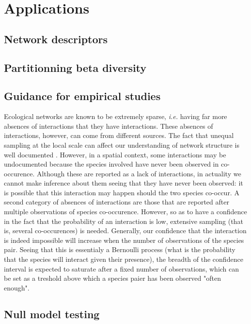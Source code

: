 \documentclass[12pt]{article}
\begin{document}
\newpage
\section*{Applications}

\subsection*{Network descriptors}

\subsection*{Partitionning beta diversity}

\subsection*{Guidance for empirical studies}

Ecological networks are known to be extremely sparse, \emph{i.e.} having far
more absences of interactions that they have interactions. These absences of
interactions, however, can come from different sources. The fact that unequal
sampling at the local scale can affect our understanding of network structure
is well documented \parencite{Martinez1999}. However, in a spatial context,
some interactions may be undocumented because the species involved have
never been observed in co-occurence. Although these are reported as a lack
of interactions, in actuality we cannot make inference about them seeing
that they have never been observed: it is possible that this interaction
may happen should the two species co-occur. A second category of absences
of interactions are those that are reported after multiple observations of
species co-occurence. However, so as to have a confidence in the fact that the
probability of an interaction is low, extensive sampling (that is, several
co-occurences) is needed. Generally, our confidence that the interaction
is indeed impossible will increase when the number of observations of the
species pair. Seeing that this is essentialy a Bernoulli process (what is
the probability that the species will interact given their presence), the
breadth of the confidence interval is expected to saturate after a fixed
number of observations, which can be set as a treshold above which a species
paier has been observed "often enough".

\subsection*{Null model testing}
\end{document}

